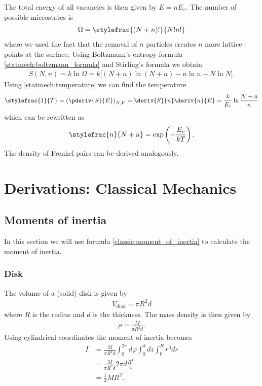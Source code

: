     The total energy of all vacancies is then given by $E = nE_v$. The number of possible microstates is
    \begin{gather}
        \Omega = \stylefrac{(N+n)!}{N!n!}
    \end{gather}
    where we used the fact that the removal of $n$ particles creates $n$ more lattice points at the surface. Using Boltzmann's entropy formula \ref{statmech:boltzmann_formula} and Stirling's formula we obtain
    \begin{gather}
        S(N, n) = k\ln\Omega = k\big[(N+n)\ln(N+n) -n\ln n - N\ln N \big].
    \end{gather}
    Using \ref{statmech:temperature} we can find the temperature
    \begin{gather}
        \stylefrac{1}{T} = \left(\pderiv{S}{E}\right)_{N, V} = \deriv{S}{n}\deriv{n}{E} = \frac{k}{E_v}\ln\frac{N+n}{n}
    \end{gather}
    which can be rewritten as
    \begin{gather}
        \stylefrac{n}{N + n} = \exp\left(-\frac{E_v}{kT}\right).
    \end{gather}
    The density of Frenkel pairs can be derived analogously.

\chapter{Derivations: Classical Mechanics}

\section{Moments of inertia}\label{deriv:inertia}

    In this section we will use formula \ref{classic:moment_of_inertia} to calculate the moment of inertia.

\subsection{Disk}

    The volume of a (solid) disk is given by
    \begin{gather}
        V_{disk} = \pi R^2d
    \end{gather}
    where $R$ is the radius and $d$ is the thickness. The mass density is then given by
    \begin{gather}
        \rho = \frac{M}{\pi R^2d}.
    \end{gather}
    Using cylindrical coordinates the moment of inertia becomes
    \begin{align}
        I &= \frac{M}{\pi R^2d}\int_0^{2\pi}d\varphi\int_0^ddz\int_0^Rr^3dr\\
        &= \frac{M}{\pi R^2d}2\pi d\frac{R^4}{4}\\
        &= \frac{1}{2}MR^2.
    \end{align}

